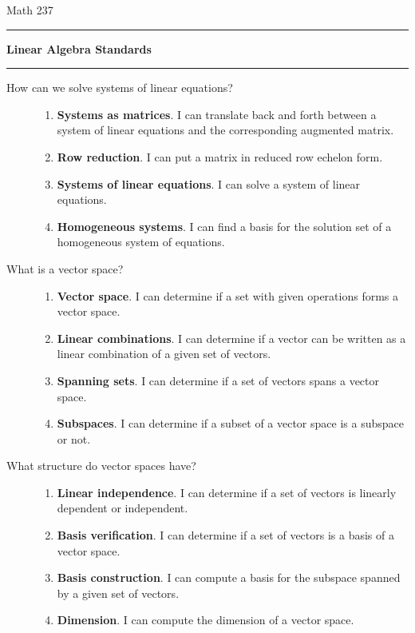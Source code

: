 
\usepackage[left=1in,right=1in,top=1in,bottom=1in]{geometry}
\usepackage{enumerate,amssymb}


\pagestyle{empty}
\noindent Math 237 \hfill \sem \hfill \prof
\vspace{0.3in}
\hrule
\begin{center}{\large \bf Linear Algebra Standards}\end{center}
\hrule


\begin{description}
\item[How can we solve systems of linear equations?] \hfill
\begin{enumerate}
\item {\bf Systems as matrices}. I can translate back and forth between a system of linear equations and the corresponding augmented matrix.
\item {\bf Row reduction}.  I can put a matrix in reduced row echelon form.
\item {\bf Systems of linear equations}. I can solve a system of linear equations.
\item {\bf Homogeneous systems}. I can find a basis for the solution set of a homogeneous system of equations.
\end{enumerate}

\item[What is a vector space?] \hfill
\begin{enumerate}
\item {\bf Vector space}. I can determine if a set with given operations forms a vector space.
\item {\bf Linear combinations}. I can determine if a vector can be written as a linear combination of a given set of vectors.
\item {\bf Spanning sets}. I can determine if a set of vectors spans a vector space.
\item {\bf Subspaces}. I can determine if a subset of a vector space is a subspace or not.

\end{enumerate}

\item [What structure do vector spaces have?] \hfill
\begin{enumerate}

\item {\bf Linear independence}. I can determine if a set of vectors is linearly dependent or independent.
\item {\bf Basis verification}. I can determine if a set of vectors is a basis of a vector space.
\item {\bf Basis construction}.  I can compute a basis for the subspace spanned by a given set of vectors.
\item {\bf Dimension}.  I can compute the dimension of a vector space.
\end{enumerate}


\end{description}
